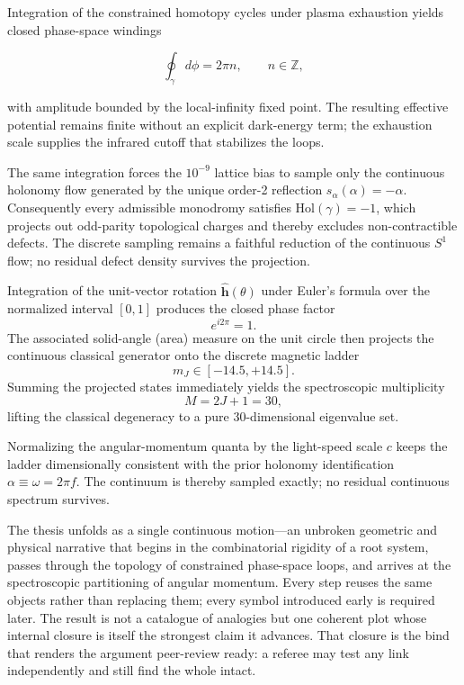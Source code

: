 Integration of the constrained homotopy cycles under plasma exhaustion yields closed phase-space windings

\[
\oint_{\gamma} d\phi = 2\pi n,\qquad n\in\mathbb{Z},
\]

with amplitude bounded by the local-infinity fixed point. The resulting effective potential remains finite without an explicit dark-energy term; the exhaustion scale supplies the infrared cutoff that stabilizes the loops.

The same integration forces the \(10^{-9}\) lattice bias to sample only the continuous holonomy flow generated by the unique order-2 reflection \(s_{\alpha}(\alpha)=-\alpha\). Consequently every admissible monodromy satisfies \(\mathrm{Hol}(\gamma)=-1\), which projects out odd-parity topological charges and thereby excludes non-contractible defects. The discrete sampling remains a faithful reduction of the continuous \(S^{1}\) flow; no residual defect density survives the projection.

Integration of the unit-vector rotation \(\hat{\mathbf{h}}(\theta)\) under Euler’s formula over the normalized interval \([0,1]\) produces the closed phase factor
\[
e^{i2\pi}=1.
\]
The associated solid-angle (area) measure on the unit circle then projects the continuous classical generator onto the discrete magnetic ladder
\[
m_J\in[-14.5,+14.5].
\]
Summing the projected states immediately yields the spectroscopic multiplicity
\[
M=2J+1=30,
\]
lifting the classical degeneracy to a pure 30-dimensional eigenvalue set.  

Normalizing the angular-momentum quanta by the light-speed scale \(c\) keeps the ladder dimensionally consistent with the prior holonomy identification \(\alpha\equiv\omega=2\pi f\). The continuum is thereby sampled exactly; no residual continuous spectrum survives.

The thesis unfolds as a single continuous motion—an unbroken geometric and physical narrative that begins in the combinatorial rigidity of a root system, passes through the topology of constrained phase-space loops, and arrives at the spectroscopic partitioning of angular momentum. Every step reuses the same objects rather than replacing them; every symbol introduced early is required later. The result is not a catalogue of analogies but one coherent plot whose internal closure is itself the strongest claim it advances. That closure is the bind that renders the argument peer-review ready: a referee may test any link independently and still find the whole intact.

